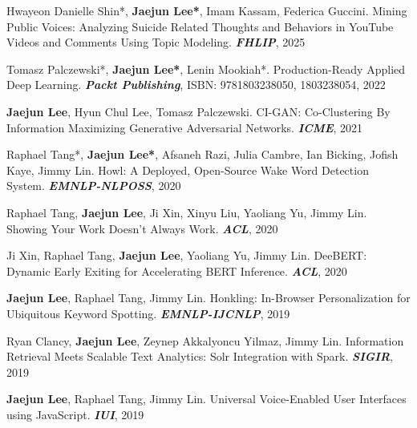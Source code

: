 \begin{cvenumerate}[1]
\item {Hwayeon Danielle Shin*, \textcolor{gray!99!black}{\textbf{Jaejun Lee*}}, Imam Kassam, Federica Guccini. Mining Public Voices: Analyzing Suicide Related Thoughts and Behaviors in YouTube Videos and Comments Using Topic Modeling. \textbf{\textit{FHLIP}}, 2025}
\item {Tomasz Palczewski*, \textcolor{gray!99!black}{\textbf{Jaejun Lee*}}, Lenin Mookiah*. Production-Ready Applied Deep Learning. \textbf{\textit{Packt Publishing}}, ISBN: 9781803238050, 1803238054, 2022}
\item \hypertarget{CI-GAN:ICME}{\textcolor{gray!99!black}{\textbf{Jaejun Lee}}, Hyun Chul Lee, Tomasz Palczewski. CI-GAN: Co-Clustering By Information Maximizing Generative Adversarial Networks. \textbf{\textit{ICME}}, 2021}
\item \hypertarget{howl:EMNLP}{Raphael Tang*, \textcolor{gray!99!black}{\textbf{Jaejun Lee*}}, Afsaneh Razi, Julia Cambre, Ian Bicking, Jofish Kaye, Jimmy Lin. Howl: A Deployed, Open-Source Wake Word Detection System. \textbf{\textit{EMNLP-NLPOSS}}, 2020}
\item \hypertarget{show:ACL}{Raphael Tang, \textcolor{gray!99!black}{\textbf{Jaejun Lee}}, Ji Xin, Xinyu Liu, Yaoliang Yu, Jimmy Lin. Showing Your Work Doesn't Always Work. \textbf{\textit{ACL}}, 2020}
\item \hypertarget{DeeBERT:ACL}{Ji Xin, Raphael Tang, \textcolor{gray!99!black}{\textbf{Jaejun Lee}}, Yaoliang Yu, Jimmy Lin. DeeBERT: Dynamic Early Exiting for Accelerating BERT Inference. \textbf{\textit{ACL}}, 2020}
\newpage
\item \hypertarget{honkling:EMNLP}{\textcolor{gray!99!black}{\textbf{Jaejun Lee}}, Raphael Tang, Jimmy Lin. Honkling: In-Browser Personalization for Ubiquitous Keyword Spotting. \textbf{\textit{EMNLP-IJCNLP}}, 2019}
\item {Ryan Clancy, \textcolor{gray!99!black}{\textbf{Jaejun Lee}}, Zeynep Akkalyoncu Yilmaz, Jimmy Lin. Information Retrieval Meets Scalable Text Analytics: Solr Integration with Spark. \textbf{\textit{SIGIR}}, 2019}
\item \hypertarget{honkling:IUI}{\textcolor{gray!99!black}{\textbf{Jaejun Lee}}, Raphael Tang, Jimmy Lin. Universal Voice-Enabled User Interfaces using JavaScript. \textbf{\textit{IUI}}, 2019}
\end{cvenumerate}
\hfill

